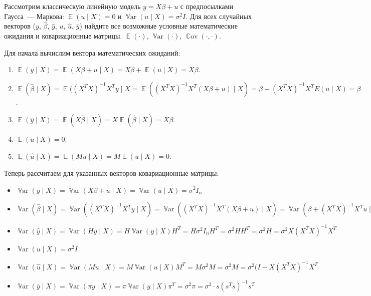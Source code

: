 \documentclass[12pt]{article}
\DeclareMathOperator{\Cov}{\mathbb{C}ov}
\DeclareMathOperator{\Var}{\mathbb{V}ar}
\DeclareMathOperator{\E}{\mathbb{E}}
\newcommand{\hb}{\hat{\beta}}
\newcommand{\hu}{\hat{u}}
\newcommand{\hy}{\hat{y}}
\newcommand{\one}{s} %
\begin{document}
\begin{problem}
Рассмотрим классическую линейную модель $y=X\beta + u$ с предпосылками Гаусса~— Маркова: $\E(u \mid X) = 0$ и $\Var(u \mid X) = \sigma^2 I$.
Для всех случайных векторов ($y$,  $\hb$, $\hy$, $u$, $\hat u$, $\bar y$) найдите все возможные условные математические ожидания и ковариационные матрицы.
$\E(\cdot)$, $\Var(\cdot)$, $\Cov(\cdot, \cdot)$.
\begin{sol}
Для начала вычислим вектора математических ожиданий:
\begin{enumerate}
    \item $\E(y \mid X) = \E(X\beta + u \mid X) = X\beta + \E(u \mid X) = X\beta$.
    \item $\E(\hb \mid X) = \E((X^TX)^{-1}X^Ty \mid X = \E((X^TX)^{-1}X^T(X\beta + u) \mid X) = \beta + (X^TX)^{-1}X^TE(u \mid X) = \beta$.
    \item $\E(\hy \mid X) = \E(X\hb \mid X) = X\E(\hb \mid X) = X\beta$.
    \item $\E(u \mid X) = 0$.
    \item $\E(\hu \mid X) = \E(Mu \mid X) = M\E(u \mid X) = 0$.
\end{enumerate}

Теперь рассчитаем для указанных векторов ковариационные матрицы:
\begin{itemize}
    \item $\Var(y \mid X) = \Var(X\beta+u \mid X) = \Var(u \mid X) = \sigma^2 I_n$
    \item $\Var(\hb \mid X) = \Var((X^TX)^{-1}X^Ty \mid X) = \Var((X^TX)^{-1}X^T(X\beta+u) \mid X) = \Var(\beta+(X^TX)^{-1}X^Tu \mid X) = \Var((X^TX)^{-1}X^Tu \mid X) = (X^TX)^{-1}X^T \Var(u) X(X^TX)^{-1} = \sigma^2(X^TX)^{-1}$
    \item $\Var(\hy \mid X) = \Var(Hy \mid X) = H\Var(y \mid X)H^T = H\sigma^2I_nH^T = \sigma^2HH^T = \sigma^2H = \sigma^2X(X^TX)^{-1}X^T$
    \item $\Var(u \mid X) = \sigma^2 I$
    \item $\Var(\hu \mid X) = \Var(Mu \mid X) = M\Var(u \mid X) M^T = M\sigma^2M = \sigma^2M = \sigma^2(I-X(X^TX)^{-1}X^T$
    \item $\Var(\bar{y} \mid X) = \Var(\pi y \mid X) = \pi \Var(y \mid X) \pi^T = \sigma^2 \pi = \sigma^2 \cdot \one(\one^T\one)^{-1}\one^T$
\end{itemize}


\end{sol}
\end{problem}
\end{document}
